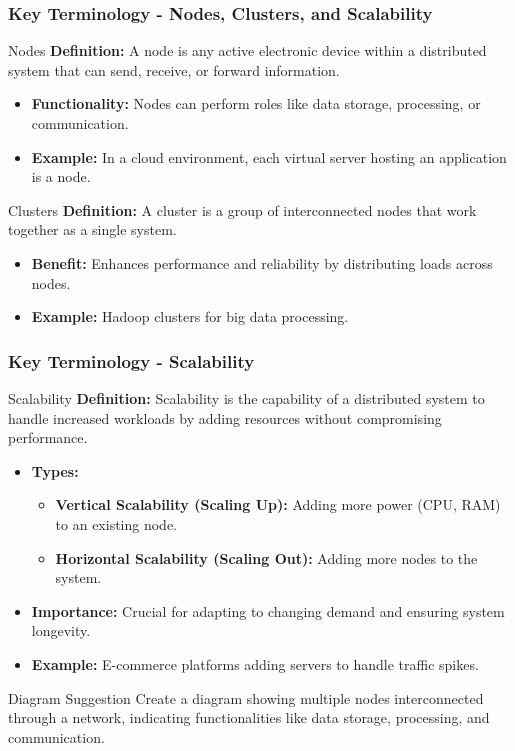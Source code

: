 \documentclass[aspectratio=169]{beamer}
\begin{document}
\begin{frame}[fragile]
    \frametitle{Key Terminology - Nodes, Clusters, and Scalability}
    \begin{block}{Nodes}
        \textbf{Definition:}  
        A node is any active electronic device within a distributed system that can send, receive, or forward information.
    \end{block}
    \begin{itemize}
        \item \textbf{Functionality:} Nodes can perform roles like data storage, processing, or communication.
        \item \textbf{Example:} In a cloud environment, each virtual server hosting an application is a node.
    \end{itemize}
    
    \begin{block}{Clusters}
        \textbf{Definition:}  
        A cluster is a group of interconnected nodes that work together as a single system.
    \end{block}
    \begin{itemize}
        \item \textbf{Benefit:} Enhances performance and reliability by distributing loads across nodes.
        \item \textbf{Example:} Hadoop clusters for big data processing.
    \end{itemize}
\end{frame}

\begin{frame}[fragile]
    \frametitle{Key Terminology - Scalability}
    \begin{block}{Scalability}
        \textbf{Definition:}  
        Scalability is the capability of a distributed system to handle increased workloads by adding resources without compromising performance.
    \end{block}
    \begin{itemize}
        \item \textbf{Types:}
        \begin{itemize}
            \item \textbf{Vertical Scalability (Scaling Up):} Adding more power (CPU, RAM) to an existing node.
            \item \textbf{Horizontal Scalability (Scaling Out):} Adding more nodes to the system.
        \end{itemize}
        \item \textbf{Importance:} Crucial for adapting to changing demand and ensuring system longevity.
        \item \textbf{Example:} E-commerce platforms adding servers to handle traffic spikes.
    \end{itemize}
    
    \begin{block}{Diagram Suggestion}
        Create a diagram showing multiple nodes interconnected through a network, indicating functionalities like data storage, processing, and communication.
    \end{block}
\end{frame}
\end{document}
